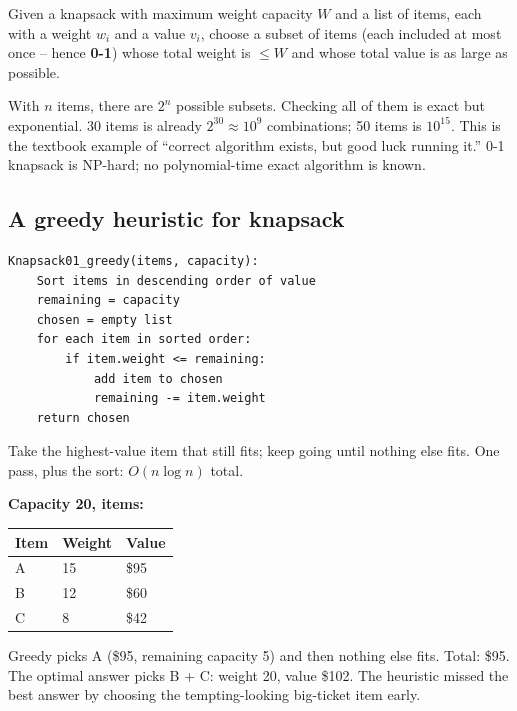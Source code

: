 \documentclass[11pt]{article}
\begin{document}
\begin{defnbox}
Given a knapsack with maximum weight capacity $W$ and a list of
items, each with a weight $w_i$ and a value $v_i$, choose a subset of
items (each included at most once -- hence \textbf{0-1}) whose total
weight is $\le W$ and whose total value is as large as possible.
\end{defnbox}

\begin{notebox}
With $n$ items, there are $2^n$ possible subsets. Checking all of
them is exact but exponential. 30 items is already $2^{30}
\approx 10^9$ combinations; 50 items is $10^{15}$. This is the
textbook example of ``correct algorithm exists, but good luck
running it.'' 0-1 knapsack is NP-hard; no polynomial-time exact
algorithm is known.
\end{notebox}

\subsection{A greedy heuristic for knapsack}

\begin{examplebox}
\begin{verbatim}
Knapsack01_greedy(items, capacity):
    Sort items in descending order of value
    remaining = capacity
    chosen = empty list
    for each item in sorted order:
        if item.weight <= remaining:
            add item to chosen
            remaining -= item.weight
    return chosen
\end{verbatim}
Take the highest-value item that still fits; keep going until nothing
else fits. One pass, plus the sort: $O(n \log n)$ total.
\end{examplebox}

\begin{warnbox}
\textbf{Capacity 20, items:}
\begin{center}
\begin{tabular}{lll}
Item & Weight & Value \\
\hline
A & 15 & \$95 \\
B & 12 & \$60 \\
C & \phantom{0}8 & \$42 \\
\end{tabular}
\end{center}
Greedy picks A (\$95, remaining capacity 5) and then nothing else
fits. Total: \$95. The optimal answer picks B + C: weight 20, value
\$102. The heuristic missed the best answer by choosing the
tempting-looking big-ticket item early.
\end{warnbox}
\end{document}
